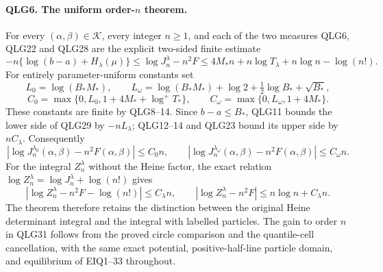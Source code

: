 \paragraph{QLG6. The uniform order-\(n\) theorem.}
For every \((\alpha,\beta)\in\mathcal K\), every integer \(n\geq1\),
and each of the two measures QLG6, QLG22 and QLG28 are the explicit
two-sided finite estimate
\[
 \boxed{
 -n\{\log(b-a)+H_\lambda(\mu)\}
 \leq\log J_n^\lambda-n^2F
 \leq 4M_*n+n\log T_\lambda+n\log n-\log(n!).}
 \tag{QLG29}
\]
For entirely parameter-uniform constants set
\[
 L_0=\log(B_*M_*),\qquad
 L_\omega=\log(B_*M_*)+\log2+\tfrac12\log B_*+\sqrt{B_*},
\]
\[
 C_0=\max\{0,L_0,1+4M_*+\log^+T_*\},\qquad
 C_\omega=\max\{0,L_\omega,1+4M_*\}.
 \tag{QLG30}
\]
These constants are finite by QLG8--14. Since \(b-a\leq B_*\),
QLG11 bounds the lower side of QLG29 by \(-nL_\lambda\); QLG12--14
and QLG23 bound its upper side by \(nC_\lambda\). Consequently
\[
 \boxed{\left|\log J_n^{\lambda_0}(\alpha,\beta)
                 -n^2F(\alpha,\beta)\right|\leq C_0n,
 \qquad
 \left|\log J_n^{\lambda_\omega}(\alpha,\beta)
                 -n^2F(\alpha,\beta)\right|\leq C_\omega n.}
 \tag{QLG31}
\]
For the integral \(Z_n^\lambda\) without the Heine factor, the exact
relation \(\log Z_n^\lambda=\log J_n^\lambda+\log(n!)\) gives
\[
 \left|\log Z_n^\lambda-n^2F-\log(n!)\right|\leq C_\lambda n,
 \qquad
 \left|\log Z_n^\lambda-n^2F\right|
                         \leq n\log n+C_\lambda n.
 \tag{QLG32}
\]
The theorem therefore retains the distinction between the original
Heine determinant integral and the integral with labelled particles.
The gain to order \(n\) in QLG31 follows from the proved circle
comparison and the quantile-cell cancellation, with the same exact
potential, positive-half-line particle domain, and equilibrium of
EIQ1--33 throughout.
